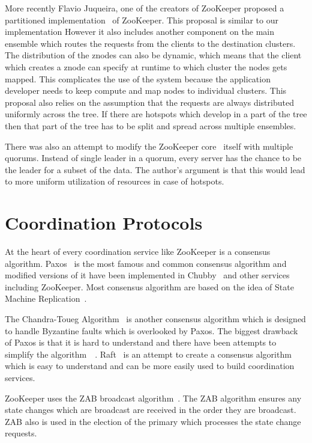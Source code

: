 More recently Flavio Juqueira, one of the creators of ZooKeeper proposed a partitioned implementation~\cite{junqueira2010partitioned} of ZooKeeper. This proposal is similar to our implementation However it also includes another component on the main ensemble which routes the requests from the clients to the destination clusters. The distribution of the znodes can also be dynamic, which means that the client which creates a znode can specify at runtime to which cluster the nodes gets mapped. This complicates the use of the system because the application developer needs to keep compute and map nodes to individual clusters. This proposal also relies on the assumption that the requests are always distributed uniformly across the tree. If there are hotspots which develop in a part of the tree then that part of the tree has to be split and spread across multiple ensembles.

There was also an attempt to modify the ZooKeeper core~\cite{biligiri2014multiquorum} itself with multiple quorums. Instead of single leader in a quorum, every server has the chance to be the leader for a subset of the data. The author's argument is that this would lead to more uniform utilization of resources in case of hotspots.

\section{Coordination Protocols}

At the heart of every coordination service like ZooKeeper is a consensus algorithm. Paxos~\cite{lamport2001paxos} is the most famous and common consensus algorithm and modified versions of it have been implemented in Chubby~\cite{burrows2006chubby} and other services including ZooKeeper. Most consensus algorithm are based on the idea of State Machine Replication~\cite{schneider1990implementing}. 

The Chandra-Toueg Algorithm~\cite{Chandra:1996:UFD:226643.226647} is another consensus algorithm which is designed to handle Byzantine faults which is overlooked by Paxos. The biggest drawback of Paxos is that it is hard to understand and there have been attempts to simplify the algorithm~\cite{chandra2007paxos}~\cite{lampson2001abcd}. Raft~\cite{ongaro2013search} is an attempt to create a consensus algorithm which is easy to understand and can be more easily used to build coordination services.

ZooKeeper uses the ZAB broadcast algorithm~\cite{junqueira2011zab}. The ZAB algorithm ensures any state changes which are broadcast are received in the order they are broadcast. ZAB also is used in the election of the primary which processes the state change requests.

